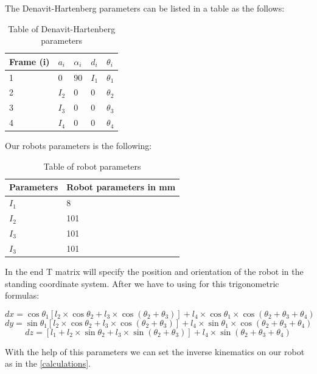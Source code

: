 			
		The Denavit-Hartenberg parameters can be listed in a table as the follows:
		
			\begin{table}[H]
				\centering
				\begin{tabular}{|l|l|l|l|l|}
				\hline
				Frame (i) & $a_i$ & $\alpha _i$ & $d_i$ & $\theta _i$ \\ \hline
				1				&   0   &  90 & $I_1$ & $\theta _1$ \\ \hline
				2				&   $I_2$   &   0  & 0 & $\theta _2$ \\ \hline
				3				&   $I_3$   &   0  & 0 & $\theta _3$ \\ \hline
				4				&   $I_4$   &   0  & 0 & $\theta _4$ \\ \hline
				\end{tabular}
				\caption{Table of Denavit-Hartenberg parameters}
			\end{table}
			
			Our robots parameters is the following:
		
			\begin{table}[H]
				\centering
				\begin{tabular}{|l|l|}
				\hline
				Parameters & Robot parameters in mm \\ \hline
				$I_1$					 &       8                 \\ \hline
				$I_2$					 &       101                 \\ \hline
				$I_3$					 &       101                 \\ \hline
				$I_3$					 &       101                 \\ \hline
				\end{tabular}
				\caption{Table of robot parameters}
			\end{table}	
			
		In the end T matrix will specify the position and orientation of the robot in the standing coordinate system.
		After we have to using for this trigonometric formulas:
	
		\hspace{15pt}\[ dx = \cos\theta _1[l_2\times \cos \theta _2 + l_3\times \cos(\theta _2 + \theta _3)] + l_4\times \cos \theta _1 \times \cos(\theta _2 + \theta _3 + \theta _4) \]
		\hspace{15pt}\[ dy = \sin\theta _1[l_2\times \cos \theta _2 + l_3\times \cos(\theta _2 + \theta _3)] + l_4\times \sin \theta _1 \times \cos(\theta _2 + \theta _3 + \theta _4) \]
		\hspace{15pt}\[ dz = [l_1 + l_2\times \sin \theta _2 + l_3\times \sin(\theta _2 + \theta _3)] + l_4\times \sin(\theta _2 + \theta _3 + \theta _4) \]
		
		With the help of this parameters we can set the inverse kinematics on our robot as in the \ref{calculations}.
		
		